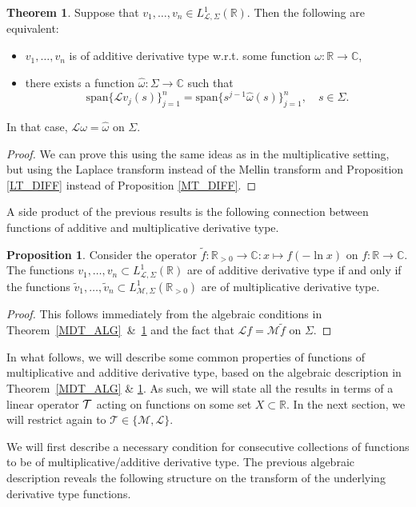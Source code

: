 \documentclass[a4paper,12pt,oneside]{article}
\theoremstyle{definition}
\newtheorem{thm}[defi]{Theorem}
\newtheorem{prop}[defi]{Proposition}
\newcommand{\C}{\mathbb{C}}
\newcommand{\R}{\mathbb{R}}
\newcommand{\om}{\omega}
\newcommand{\spn}[1]{\text{span}\{#1\}}
\newcommand{\MT}[1]{\mathcal{M}#1}
\newcommand{\LT}[1]{\mathcal{L}#1}
\newcommand{\T}[1]{\mathcal{T}#1}
\begin{document}
\begin{thm} \label{ADT_ALG}
    Suppose that $v_1,\dots,v_n\in L_{\LT{},\Sigma}^1(\R)$. Then the following are equivalent:
    \begin{itemize}
        \item[$i)$] $v_1,\dots,v_n$ is of additive derivative type w.r.t. some function $\om:\R\to\C$,
        \item[$ii)$] there exists a function $\hat{\om}:\Sigma\to\C$ such that
        $$\spn{\LT{v}_j(s)}_{j=1}^n = \spn{ s^{j-1} \hat{\om}(s)}_{j=1}^n,\quad s\in \Sigma.$$
    \end{itemize}
        In that case, $\LT{\om}=\hat{\om}$ on $\Sigma$.
\end{thm}
\begin{proof}
   We can prove this using the same ideas as in the multiplicative setting, but using the Laplace transform instead of the Mellin transform and Proposition \ref{LT_DIFF} instead of Proposition \ref{MT_DIFF}.
\end{proof}

A side product of the previous results is the following connection between functions of additive and multiplicative derivative type.

\begin{prop}
    Consider the operator $\tilde{f}: \R_{>0}\to\C:x\mapsto f(-\ln x)$ on $f:\R\to\C$. The functions $v_1,\dots,v_n\subset L_{\LT{},\Sigma}^1(\R)$ are of additive derivative type if and only if the functions $\tilde{v}_1,\dots,\tilde{v}_n\subset L_{\MT{},\Sigma}^1(\R_{>0})$ are of multiplicative derivative type.      
\end{prop}
\begin{proof}
    This follows immediately from the algebraic conditions in Theorem~\ref{MDT_ALG}~\&~\ref{ADT_ALG} and the fact that $ \LT{f} = \MT{\tilde{f}}$ on $\Sigma$.
\end{proof}


In what follows, we will describe some common properties of functions of multiplicative and additive derivative type, based on the algebraic description in Theorem~\ref{MDT_ALG} \& \ref{ADT_ALG}. As such, we will state all the results in terms of a linear operator $\T$ acting on functions on some set $X\subset\R$. In the next section, we will restrict again to $\T\in\{\MT{},\LT{}\}$.
\medbreak

We will first describe a necessary condition for consecutive collections of functions to be of multiplicative/additive derivative type. The previous algebraic description reveals the following structure on the transform of the underlying derivative type functions.
\end{document}
